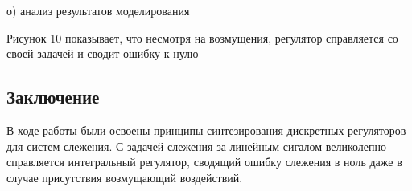 \documentclass[a4paper,14pt]{extreport}
\begin{document}
о) анализ результатов моделирования

Рисунок 10 показывает, что несмотря на возмущения, регулятор справляется со своей задачей и сводит ошибку к нулю

\subsection{Заключение}

В ходе работы были освоены принципы синтезирования дискретных
регуляторов для систем слежения. С задачей слежения за линейным сигалом великолепно справляется интегральный регулятор, сводящий ошибку слежения в ноль даже в случае присутствия возмущающий воздействий.
\end{document}
